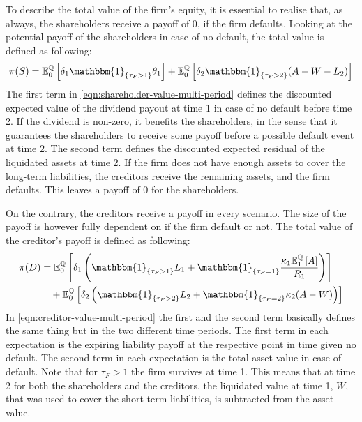 \documentclass[main.tex]{subfiles}
\begin{document}
        To describe the total value of the firm's equity, it is essential to realise that, as always, the shareholders receive a payoff of 0, if the firm defaults.
        Looking at the potential payoff of the shareholders in case of no default, the total value is defined as following:
        \begin{equation}
            \pi(S)=
            \mathbb{E}_{0}^{\rnmeasure}\left[
                \delta_1\mathbbm{1}_{\{\tau_{F}>1\}} \theta_1
            \right]
            +
            \mathbb{E}_{0}^{\rnmeasure}\left[
                \delta_{2}\mathbbm{1}_{\{\tau_{F}>2\}} (A-W-L_{2})
            \right]
            \label{eqn:shareholder-value-multi-period}
        \end{equation}
        The first term in \cref{eqn:shareholder-value-multi-period} defines the discounted expected value of the dividend payout at time 1 in case of no default before time 2.
        If the dividend is non-zero, it benefits the shareholders,
        in the sense that it guarantees the shareholders to receive some payoff before a possible default event at time 2.
        The second term defines the discounted expected residual of the liquidated assets at time 2.
        If the firm does not have enough assets to cover the long-term liabilities, the creditors receive the remaining assets, and the firm defaults.
        This leaves a payoff of 0 for the shareholders.

        On the contrary, the creditors receive a payoff in every scenario.
        The size of the payoff is however fully dependent on if the firm default or not.
        The total value of the creditor's payoff is defined as following:
        \begin{align}
            \pi(D)&=
            \mathbb{E}_{0}^{\rnmeasure}\left[
                \delta_1
                \left(\mathbbm{1}_{\{\tau_{F}>1\}} L_1 + \mathbbm{1}_{\{\tau_{F}=1\}} 
                \frac{
                    \kappa_1 \mathbb{E}_{1}^{\rnmeasure}\left[A\right]
                }{
                    R_1
                }
                \right)
            \right]
            \nonumber
            \\
            &\quad+
            \mathbb{E}_{0}^{\rnmeasure}\left[
                \delta_{2}
                \left(\mathbbm{1}_{\{\tau_{F}>2\}}L_{2}
                +
                \mathbbm{1}_{\{\tau_{F}=2\}}\kappa_{2}(A-W)
                \right)
            \right]
            \label{eqn:creditor-value-multi-period}
        \end{align}
        In \cref{eqn:creditor-value-multi-period} the first and the second term basically defines the same thing but in the two different time periods.
        The first term in each expectation is the expiring liability payoff at the respective point in time given no default.
        The second term in each expectation is the total asset value in case of default.
        Note that for $\tau_{F}>1$ the firm survives at time 1.
        This means that at time 2 for both the shareholders and the creditors, the liquidated value at time 1, $W$,
        that was used to cover the short-term liabilities, is subtracted from the asset value.
\end{document}

